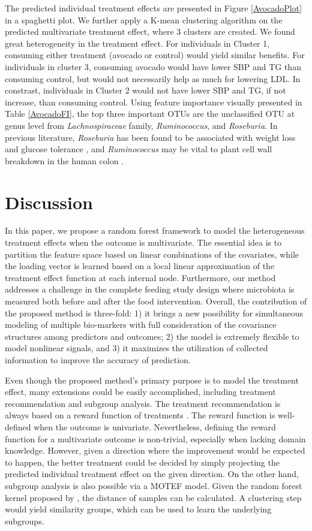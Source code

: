\documentclass[smallextended]{svjour3}
\begin{document}
The predicted individual treatment effects are presented in Figure \ref{AvocadoPlot} in a spaghetti plot. We further apply a K-mean clustering algorithm on the predicted multivariate treatment effect, where 3 clusters are created. We found great heterogeneity in the treatment effect. For individuals in Cluster 1, consuming either treatment (avocado or control) would yield similar benefits. For individuals in cluster 3, consuming avocado would have lower SBP and TG than consuming control, but would not necessarily help as much for lowering LDL. In constrast, individuals in Cluster 2 would not have lower SBP and TG, if not increase, than consuming control. Using feature importance visually presented in Table \ref{AvocadoFI}, the top three important OTUs are the unclassified OTU at genus level from \textit{Lachnospiraceae} family, \textit{Ruminococcus}, and \textit{Roseburia}. In previous literature, \textit{Roseburia} has been found to be associated with weight loss and glucose tolerance \citep{ryan2014fxr}, and \textit{Ruminococcus} may be vital to plant cell wall breakdown in the human colon \citep{ze2012ruminococcus}.


\section{Discussion}\label{Disc}

In this paper, we propose a random forest framework to model the heterogeneous treatment effects when the outcome is multivariate. The essential idea is to partition the feature space based on linear combinations of the covariates, while the loading vector is learned based on a local linear approximation of the treatment effect function at each internal node. Furthermore, our method addresses a challenge in the complete feeding study design where microbiota is measured both before and after the food intervention. Overall, the contribution of the proposed method is three-fold: 1) it brings a new possibility for simultaneous modeling of multiple bio-markers with full consideration of the covariance structures among predictors and outcomes; 2) the model is extremely flexible to model nonlinear signals, and 3) it maximizes the utilization of collected information to improve the accuracy of prediction. 

Even though the proposed method's primary purpose is to model the treatment effect, many extensions could be easily accomplished, including treatment recommendation and subgroup analysis. The treatment recommendation is always based on a reward function of treatments \citep{qian2011performance}. The reward function is well-defined when the outcome is univariate. Nevertheless, defining the reward function for a multivariate outcome is non-trivial, especially when lacking domain knowledge. However, given a direction where the improvement would be expected to happen, the better treatment could be decided by simply projecting the predicted individual treatment effect on the given direction. On the other hand, subgroup analysis is also possible via a MOTEF model. Given the random forest kernel proposed by \cite{davies2014random}, the distance of samples can be calculated. A clustering step would yield similarity groups, which can be used to learn the underlying subgroups.
\end{document}
